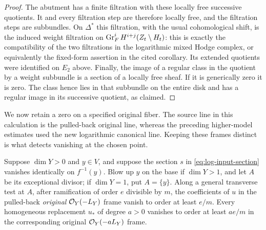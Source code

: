 \begin{proof}
The abutment has a finite filtration with these locally free
successive quotients.  It and every filtration step are
therefore locally free, and the filtration steps are
subbundles.  On $\Delta^*$ this filtration, with the usual
cohomological shift, is the induced weight filtration on
$\operatorname{Gr}_F^i H^{i+j}(Z_t\setminus H_t)$: this is exactly the
compatibility of the two filtrations in the logarithmic mixed
Hodge complex, or equivalently the fixed-form assertion in
the cited corollary.  Its extended quotients were identified
on $E_2$ above.  Finally, the image of a regular class in the
quotient by a weight subbundle is a section of a locally free
sheaf.  If it is generically zero it is zero.  The class hence
lies in that subbundle on the entire disk and has a regular
image in its successive quotient, as claimed.
\end{proof}

We now retain a zero on a specified original fiber. The source line in
this calculation is the pulled-back original line, whereas the preceding
higher-model estimates used the new logarithmic canonical line. Keeping
these frames distinct is what detects vanishing at the chosen point.

\begin{lemma}\label{lem:zero-test}
Suppose $\dim Y>0$ and $y\in V$, and suppose the section $s$ in
\eqref{eq:log-input-section} vanishes identically on $f^{-1}(y)$.
Blow up $y$ on the base if $\dim Y>1$, and let $A$ be its
exceptional divisor; if $\dim Y=1$, put $A=\{y\}$.
Along a general transverse test at $A$, after ramification
of order $e$ divisible by $m$, the coefficients of $u$ in
the pulled-back \emph{original} $\mathcal O_Y(-L_Y)$ frame vanish
to order at least $e/m$.  Every homogeneous replacement
$u_*$ of degree $a>0$ vanishes to order at least $ae/m$
in the corresponding original $\mathcal O_Y(-aL_Y)$ frame.
\end{lemma}

